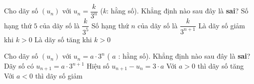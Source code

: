\begin{ex}%
	Cho dãy số $(u_n)$ với $u_n=\dfrac{k}{3^n}$ ($k$: hằng số). Khẳng định nào sau đây là \textbf{sai}?
	\choice
	{Số hạng thứ $5$ của dãy số là $\dfrac{k}{3^5}$}
	{\True Số hạng thứ $n$ của dãy số là $\dfrac{k}{3^{n+1}}$}
	{Là dãy số giảm khi $k > 0$}
	{Là dãy số tăng khi $k > 0$}
\end{ex}%
\begin{ex}%
	Cho dãy số $ \left( u_n \right) $ với $ u_n = a \cdot 3^n$ ( $a$ : hằng số). Khẳng định nào sau đây là \textbf{sai}?
	\choice
	{Dãy số có $ u_{n + 1} = a \cdot 3^{n + 1} $}
	{\True Hiệu số $ u_{n + 1} - u_n = 3 \cdot a $}
	{Với $ a > 0 $ thì dãy số tăng}
	{Với $ a < 0 $ thì dãy số giảm}
\end{ex}